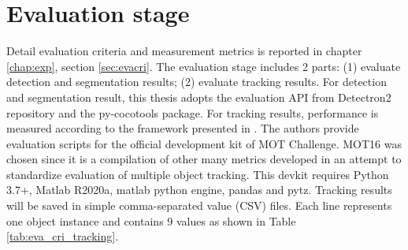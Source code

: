 \section{Evaluation stage}
Detail evaluation criteria and measurement metrics is reported in chapter \ref{chap:exp}, section \ref{sec:evacri}. The evaluation stage includes 2 parts: (1) evaluate detection and segmentation results; (2) evaluate tracking results. For detection and segmentation result, this thesis adopts the evaluation API from Detectron2 repository and the py-cocotools package. For tracking results, performance is measured according to the framework presented in \cite{DBLP:journals/corr/MilanL0RS16}. The authors provide evaluation scripts for the official development kit of MOT Challenge. MOT16 was chosen since it is a compilation of other many metrics developed in an attempt to standardize evaluation of multiple object tracking. This devkit requires Python 3.7+, Matlab R2020a, matlab python engine, pandas and pytz. Tracking results will be saved in simple comma-separated value (CSV) files. Each line represents one object instance and contains 9 values as shown in Table \ref{tab:eva_cri_tracking}.
